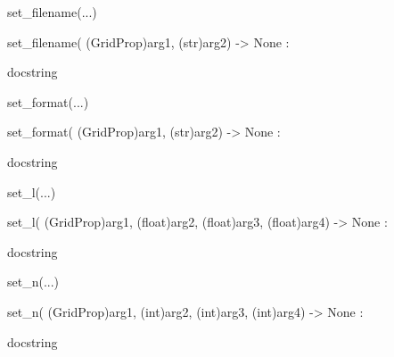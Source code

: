 \documentclass[letterpaper,10pt,english]{sphinxmanual}
\begin{document}
\begin{description}
\begin{description}
\begin{DUlineblock}{0em}
\begin{DUlineblock}{\DUlineblockindent}
\begin{DUlineblock}{\DUlineblockindent}
\item[] 
\end{DUlineblock}
\end{DUlineblock}
\item[] set\_filename(...)
\item[]
\begin{DUlineblock}{\DUlineblockindent}
\item[] set\_filename( (GridProp)arg1, (str)arg2) -\textgreater{} None :
\item[]
\begin{DUlineblock}{\DUlineblockindent}
\item[] docstring
\item[] 
\end{DUlineblock}
\end{DUlineblock}
\item[] set\_format(...)
\item[]
\begin{DUlineblock}{\DUlineblockindent}
\item[] set\_format( (GridProp)arg1, (str)arg2) -\textgreater{} None :
\item[]
\begin{DUlineblock}{\DUlineblockindent}
\item[] docstring
\item[] 
\end{DUlineblock}
\end{DUlineblock}
\item[] set\_l(...)
\item[]
\begin{DUlineblock}{\DUlineblockindent}
\item[] set\_l( (GridProp)arg1, (float)arg2, (float)arg3, (float)arg4) -\textgreater{} None :
\item[]
\begin{DUlineblock}{\DUlineblockindent}
\item[] docstring
\item[] 
\end{DUlineblock}
\end{DUlineblock}
\item[] set\_n(...)
\item[]
\begin{DUlineblock}{\DUlineblockindent}
\item[] set\_n( (GridProp)arg1, (int)arg2, (int)arg3, (int)arg4) -\textgreater{} None :
\item[]
\begin{DUlineblock}{\DUlineblockindent}
\item[] docstring

\end{DUlineblock}
\end{DUlineblock}
\end{DUlineblock}
\end{description}
\end{description}
\end{document}
